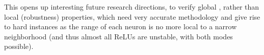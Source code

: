 \documentclass{llncs}
\begin{document}
This opens up interesting future research directions, to verify global \cite{lipshitz}, \cite{sensing} rather than local (robustness) properties, which need very accurate methodology
and give rise to hard instances as the range of each neuron is no more local to a narrow neighborhood (and thus almost all ReLUs are unstable, with both modes possible).






\newpage






\bigskip

\appendix


\end{document}
